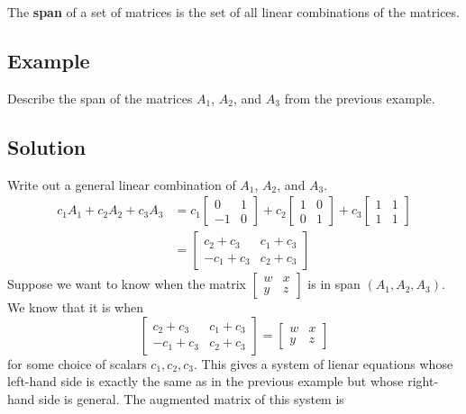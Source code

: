 The \textbf{span} of a set of matrices is the set of all linear combinations of
the matrices.

\subsection*{Example}
Describe the span of the matrices $A_1$, $A_2$, and $A_3$ from the previous example.

\subsection*{Solution}
Write out a general linear combination of $A_1$, $A_2$, and $A_3$.
\begin{align*}
    c_1A_1+c_2A_2+c_3A_3 & =
    c_1\begin{bmatrix}
        0  & 1 \\
        -1 & 0
    \end{bmatrix}+
    c_2\begin{bmatrix}
        1 & 0 \\
        0 & 1
    \end{bmatrix}+
    c_3\begin{bmatrix}
        1 & 1 \\
        1 & 1
    \end{bmatrix}                      \\
                         & =\begin{bmatrix}
        c_2+c_3  & c_1+c_3 \\
        -c_1+c_3 & c_2+c_3
    \end{bmatrix}
\end{align*}
Suppose we want to know when the matrix $\begin{bmatrix}
        w & x \\
        y & z
    \end{bmatrix}$ is in span $(A_1,A_2,A_3)$. We know that it is when
\[
    \begin{bmatrix}
        c_2+c_3  & c_1+c_3 \\
        -c_1+c_3 & c_2+c_3
    \end{bmatrix}=
    \begin{bmatrix}
        w & x \\
        y & z
    \end{bmatrix}
\]
for some choice of scalars $c_1, c_2, c_3$. This gives a system of lienar equations
whose left-hand side is exactly the same as in the previous example but whose
right-hand side is general. The augmented matrix of this system is
